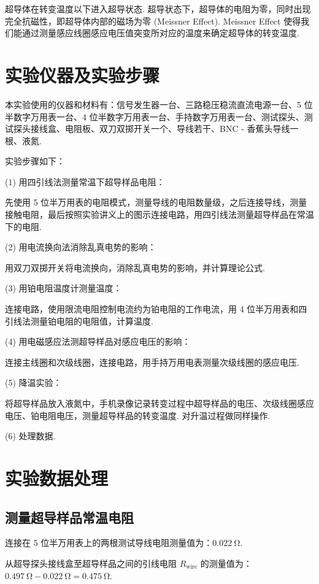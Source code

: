 \documentclass{THUexprep}
\begin{document}
超导体在转变温度以下进入超导状态. 超导状态下，超导体的电阻为零，同时出现完全抗磁性，即超导体内部的磁场为零 (Meissner Effect). Meissner Effect 使得我们能通过测量感应线圈感应电压值突变所对应的温度来确定超导体的转变温度.

\section{实验仪器及实验步骤}

本实验使用的仪器和材料有：信号发生器一台、三路稳压稳流直流电源一台、5 位半数字万用表一台、4 位半数字万用表一台、手持数字万用表一台、测试探头、测试探头接线盒、电阻板、双刀双掷开关一个、导线若干、BNC - 香蕉头导线一根、液氮.

实验步骤如下：

(1) 用四引线法测量常温下超导样品电阻：

先使用 5 位半万用表的电阻模式，测量导线的电阻数量级，之后连接导线，测量接触电阻，最后按照实验讲义上的图示连接电路，用四引线法测量超导样品在常温下的电阻.

(2) 用电流换向法消除乱真电势的影响：

用双刀双掷开关将电流换向，消除乱真电势的影响，并计算理论公式.

(3) 用铂电阻温度计测量温度：

连接电路，使用限流电阻控制电流约为铂电阻的工作电流，用 4 位半万用表和四引线法测量铂电阻的电阻值，计算温度.

(4) 用电磁感应法测超导样品对感应电压的影响：

连接主线圈和次级线圈，连接电路，用手持万用电表测量次级线圈的感应电压.

(5) 降温实验：

将超导样品放入液氮中，手机录像记录转变过程中超导样品的电压、次级线圈感应电压、铂电阻电压，测量超导样品的转变温度. 对升温过程做同样操作.

(6) 处理数据.

\section{实验数据处理}

\subsection{测量超导样品常温电阻}

连接在 5 位半万用表上的两根测试导线电阻测量值为：$\SI{0.022}{\ohm}$.

从超导探头接线盒至超导样品之间的引线电阻 $R_\text{wire}$ 的测量值为：$\SI{0.497}{\ohm}-\SI{0.022}{\ohm}=\SI{0.475}{\ohm}$.
\end{document}
